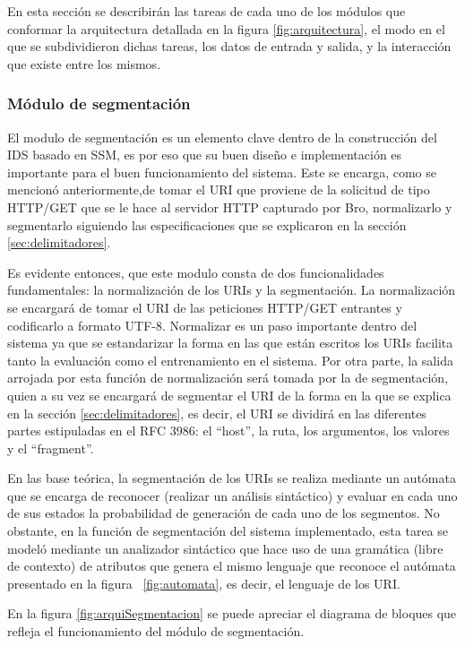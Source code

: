 En esta sección se describirán las tareas de cada uno de los módulos que conformar la arquitectura detallada en la figura \ref{fig:arquitectura}, el modo en el que se subdividieron dichas tareas, los datos de entrada y salida, y la interacción que existe entre los mismos.

\subsubsection{Módulo de segmentación}

El modulo de segmentación es un elemento clave dentro de la construcción del IDS basado en SSM, es por eso que su buen diseño e implementación es importante para el buen funcionamiento del sistema. Este se encarga, como se mencionó anteriormente,de tomar el URI que proviene de la solicitud de tipo HTTP/GET que se le hace al servidor HTTP capturado por Bro, normalizarlo y segmentarlo siguiendo las especificaciones que se explicaron en la sección \ref{sec:delimitadores}. 

Es evidente entonces, que este modulo consta de dos funcionalidades fundamentales: la normalización de los URIs y la segmentación.  La normalización se encargará de tomar el URI de las peticiones HTTP/GET entrantes y codificarlo a formato UTF-8. Normalizar es un paso importante dentro del sistema  ya que se estandarizar la forma en las que están escritos los URIs facilita tanto la evaluación como el entrenamiento en el sistema. Por otra parte, la salida arrojada por esta función de normalización será tomada por la de segmentación, quien a su vez se encargará de segmentar el URI de la forma en la que se explica en la sección \ref{sec:delimitadores}, es decir, el URI se dividirá en las diferentes partes estipuladas en el RFC 3986: el ``host'', la ruta, los argumentos, los valores y el ``fragment''.

 En las base teórica, la segmentación de los URIs se realiza mediante un autómata que se encarga de reconocer (realizar un análisis sintáctico) y evaluar en cada uno de sus estados la probabilidad de generación de cada uno de los segmentos.  No obstante, en la función de segmentación del sistema implementado, esta tarea se modeló mediante un analizador sintáctico que hace uso de una gramática (libre de contexto) de atributos que genera el mismo lenguaje que reconoce el autómata presentado en la figura ~\ref{fig:automata}, es decir, el lenguaje de los URI.

En la figura \ref{fig:arquiSegmentacion} se puede apreciar el diagrama de bloques que refleja el funcionamiento del módulo de segmentación.

